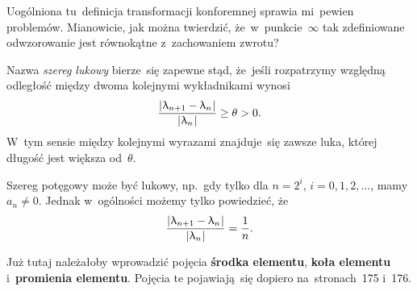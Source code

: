 \documentclass[a4paper,11pt]{article}
\numberwithin{equation}{section}
\renewcommand{\lambda}{\uplambda}
\begin{document}
\VerSpaceFour





\noindent
{} Uogólniona tu~definicja transformacji konforemnej sprawia
mi~pewien problemów. Mianowicie, jak można twierdzić, że~w~punkcie~$\infty$ tak
zdefiniowane odwzorowanie jest równokątne z~zachowaniem zwrotu?

\VerSpaceFour





\noindent
{} Nazwa \textit{szereg lukowy} bierze~się zapewne stąd, że~jeśli
rozpatrzymy względną odległość między dwoma kolejnymi wykładnikami wynosi
\begin{equation}
  \label{eq:Leja-Funkcje-zespolone-49}
  \frac{ \absOne{ \lambda_{ n + 1 } - \lambda_{ n } } }{ \absOne{ \lambda_{ n } } } \geq
  \theta > 0.
\end{equation}
W~tym sensie między kolejnymi wyrazami znajduje~się zawsze luka,
której długość jest większa od~$\theta$.

Szereg potęgowy może być lukowy, np.~gdy tylko dla $n = 2^{ i }$,
$i = 0, 1, 2, \ldots$, mamy $a_{ n } \neq 0$. Jednak w~ogólności możemy
tylko powiedzieć, że
\begin{equation}
  \label{eq:Leja-Funkcje-zespolone-50}
  \frac{ \absOne{ \lambda_{ n + 1 } - \lambda_{ n } } }{ \absOne{ \lambda_{ n } } } =
  \frac{ 1 }{ n }.
\end{equation}

\VerSpaceFour





\noindent
{} Już tutaj należałoby wprowadzić pojęcia \textbf{środka elementu},
\textbf{koła elementu} i~\textbf{promienia elementu}. Pojęcia te
pojawiają~się dopiero na~stronach~175 i~176.

\VerSpaceFour
\end{document}
